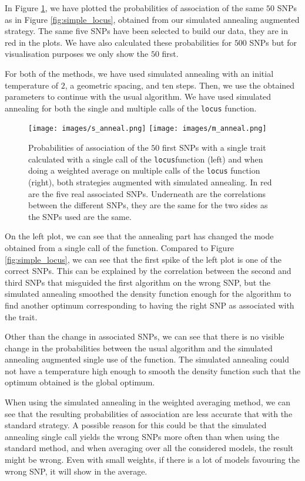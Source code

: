 \documentclass[a4paper, 11pt]{report}
\numberwithin{equation}{chapter}
\begin{document}
In Figure \ref{fig:anneal_locus}, we have plotted the probabilities of association of the same $50$ SNPs as in Figure \ref{fig:simple_locus}, obtained from our simulated annealing augmented strategy. The same five SNPs have been selected to build our data, they are in red in the plots. We have also calculated these probabilities for $500$ SNPs but for visualisation purposes we only show the $50$ first.

For both of the methods, we have used simulated annealing with an initial temperature of $2$, a geometric spacing, and ten steps. Then, we use the obtained parameters to continue with the usual algorithm. We have used simulated annealing for both the single and multiple calls of the \texttt{locus} function.

\begin{center}
\begin{figure}[h!]
\texttt{[image: images/s\_anneal.png]}
\texttt{[image: images/m\_anneal.png]}
\caption{\label{fig:anneal_locus}Probabilities of association of the $50$ first SNPs with a single trait calculated with a single call of the \texttt{locus}function (left) and when doing a weighted average on multiple calls of the \texttt{locus} function (right), both strategies augmented with simulated annealing. In red are the five real associated SNPs. Underneath are the correlations between the different SNPs, they are the same for the two sides as the SNPs used are the same.}
\end{figure}
\end{center}
On the left plot, we can see that the annealing part has changed the mode obtained from a single call of the function. Compared to Figure \ref{fig:simple_locus}, we can see that the first spike of the left plot is one of the correct SNPs. This can be explained by the correlation between the second and third SNPs that misguided the first algorithm on the wrong SNP, but the simulated annealing smoothed the density function enough for the algorithm to find another optimum corresponding to having the right SNP as associated with the trait.

Other than the change in associated SNPs, we can see that there is no visible change in the probabilities between the usual algorithm and the simulated annealing augmented single use of the function. The simulated annealing could not have a temperature high enough to smooth the density function such that the optimum obtained is the global optimum.

When using the simulated annealing in the weighted averaging method, we can see that the resulting probabilities of association are less accurate that with the standard strategy. A possible reason for this could be that the simulated annealing single call yields the wrong SNPs more often than when using the standard method, and when averaging over all the considered models, the result might be wrong. Even with small weights, if there is a lot of models favouring the wrong SNP, it will show in the average.
 
\end{document}
